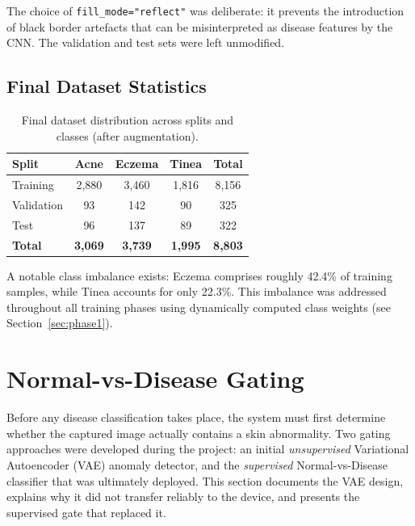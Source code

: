 The choice of \texttt{fill\_mode="reflect"} was deliberate: it prevents the introduction of black border artefacts that can be misinterpreted as disease features by the CNN. The validation and test sets were left unmodified.

\subsection{Final Dataset Statistics}

\begin{table}[H]
\centering
\caption{Final dataset distribution across splits and classes (after augmentation).}
\label{tab:dataset_stats}
\begin{tabular}{|l|c|c|c|c|}
\hline
\textbf{Split} & \textbf{Acne} & \textbf{Eczema} & \textbf{Tinea} & \textbf{Total} \\ \hline
Training  & 2{,}880 & 3{,}460 & 1{,}816 & 8{,}156 \\ \hline
Validation & 93 & 142 & 90 & 325 \\ \hline
Test & 96 & 137 & 89 & 322 \\ \hline
\textbf{Total} & \textbf{3{,}069} & \textbf{3{,}739} & \textbf{1{,}995} & \textbf{8{,}803} \\ \hline
\end{tabular}
\end{table}

A notable class imbalance exists: Eczema comprises roughly 42.4\% of training samples, while Tinea accounts for only 22.3\%. This imbalance was addressed throughout all training phases using dynamically computed class weights (see Section~\ref{sec:phase1}).


\section{Normal-vs-Disease Gating}
\label{sec:vae}

Before any disease classification takes place, the system must first determine
whether the captured image actually contains a skin abnormality. Two gating
approaches were developed during the project: an initial \emph{unsupervised}
Variational Autoencoder (VAE) anomaly detector, and the \emph{supervised}
Normal-vs-Disease classifier that was ultimately deployed. This section
documents the VAE design, explains why it did not transfer reliably to the
device, and presents the supervised gate that replaced it.


